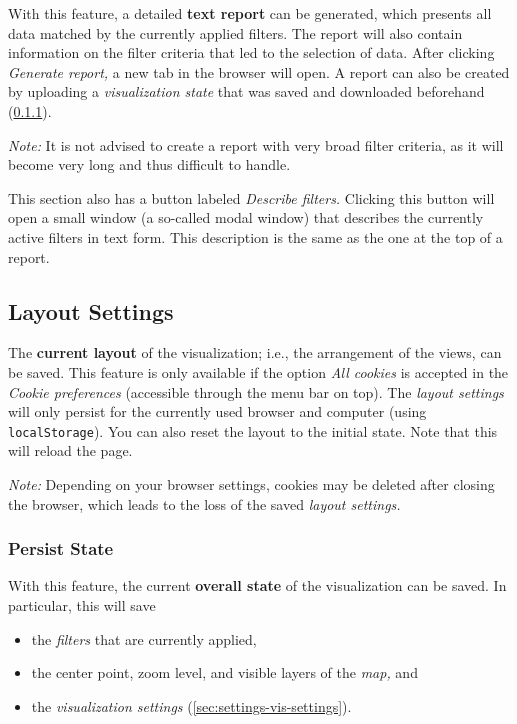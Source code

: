 With this feature, a detailed \textbf{text report} can be generated, which presents all data matched by the currently applied filters.
The report will also contain information on the filter criteria that led to the selection of data.
After clicking \emph{Generate report,} a new tab in the browser will open.
A report can also be created by uploading a \emph{visualization state} that was saved and downloaded beforehand (\cref{sec:settings-persist-state}).

\emph{Note:} It is not advised to create a report with very broad filter criteria, as it will become very long and thus difficult to handle.

This section also has a button labeled \emph{Describe filters.}
Clicking this button will open a small window (a so-called modal window) that describes the currently active filters in text form.
This description is the same as the one at the top of a report.


\subsection{Layout Settings}

The \textbf{current layout} of the visualization; i.e., the arrangement of the views, can be saved.
This feature is only available if the option \emph{All cookies} is accepted in the \emph{Cookie preferences} (accessible through the menu bar on top).
The \emph{layout settings} will only persist for the currently used browser and computer (using \verb!localStorage!).
You can also reset the layout to the initial state. Note that this will reload the page.

\emph{Note:} Depending on your browser settings, cookies may be deleted after closing the browser, which leads to the loss of the saved \emph{layout settings.}


\subsubsection{Persist State}
\label{sec:settings-persist-state}
\label{sec:vis-reproducible}

With this feature, the current \textbf{overall state} of the visualization can be saved.
In particular, this will save

\begin{itemize}
  \item the \emph{filters} that are currently applied,
  \item the center point, zoom level, and visible layers of the \emph{map,} and
  \item the \emph{visualization settings} (\cref{sec:settings-vis-settings}).
\end{itemize}

